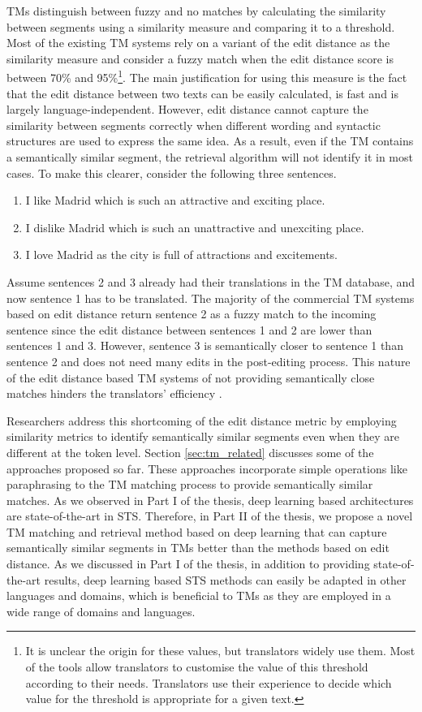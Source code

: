 TMs distinguish between fuzzy and no matches by calculating the similarity between segments using a similarity measure and comparing it to a threshold. Most of the existing TM systems rely on a variant of the edit distance as the similarity measure and consider a fuzzy match when the edit distance score is between 70\% and 95\%\footnote{It is unclear the origin for these values, but translators widely use them. Most of the tools allow translators to customise the value of this threshold according to their needs. Translators use their experience to decide which value for the threshold is appropriate for a given text.}. The main justification for using this measure is the fact that the edit distance between two texts can be easily calculated, is fast and is largely language-independent. However, edit distance cannot capture the similarity between segments correctly when different wording and syntactic structures are used to express the same idea. As a result, even if the TM contains a semantically similar segment, the retrieval algorithm will not identify it in most cases. To make this clearer, consider the following three sentences. 
 

\begin{enumerate}
	\item I like Madrid which is such an attractive and exciting place.
	\item I dislike Madrid which is such an unattractive and unexciting place.
	\item I love Madrid as the city is full of attractions and excitements.
\end{enumerate}


Assume sentences 2 and 3 already had their translations in the TM database, and now sentence 1 has to be translated. The majority of the commercial TM systems based on edit distance return sentence 2 as a fuzzy match to the incoming sentence since the edit distance between sentences 1 and 2 are lower than sentences 1 and 3. However, sentence 3 is semantically closer to sentence 1 than sentence 2 and does not need many edits in the post-editing process. This nature of the edit distance based TM systems of not providing semantically close matches hinders the translators' efficiency \autocite{ranasinghe-etal-2020-intelligent}. 

Researchers address this shortcoming of the edit distance metric by employing similarity metrics to identify semantically similar segments even when they are different at the token level. Section \ref{sec:tm_related} discusses some of the approaches proposed so far. These approaches incorporate simple operations like paraphrasing to the TM matching process to provide semantically similar matches. As we observed in Part I of the thesis, deep learning based architectures are state-of-the-art in STS. Therefore, in Part II of the thesis, we propose a novel TM matching and retrieval method based on deep learning that can capture semantically similar segments in TMs better than the methods based on edit distance. As we discussed in Part I of the thesis, in addition to providing state-of-the-art results, deep learning based STS methods can easily be adapted in other languages and domains, which is beneficial to TMs as they are employed in a wide range of domains and languages. 


